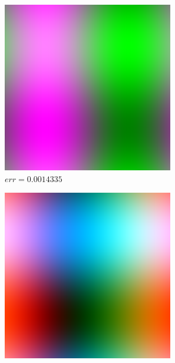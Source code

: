 \documentclass[12pt, a4paper]{article}
\begin{document}
    \begin{figure}[h]
        \begin{subfigure}{.3\textwidth}
            \includegraphics[width=.95\textwidth]{../fstFunBL.png}
            \caption{$err = 0.0014335$}
        \end{subfigure}
        \begin{subfigure}{.3\textwidth}
            \includegraphics[width=.95\textwidth]{../secFunBL.png}

\end{subfigure}
\end{figure}
\end{document}
